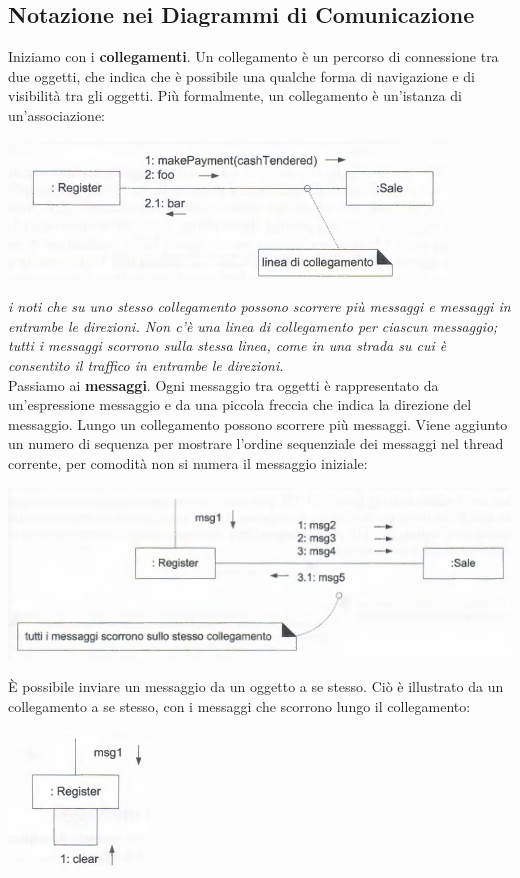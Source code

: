 \documentclass[a4paper,12pt, oneside]{book}
\begin{document}
\subsection{Notazione nei Diagrammi di Comunicazione}
Iniziamo con i \textbf{collegamenti}. Un collegamento è un percorso di connessione tra due oggetti, che indica che è possibile una qualche forma di navigazione e di visibilità tra gli oggetti. Più formalmente, un collegamento è un'istanza di un'associazione:
\begin{center}
	\includegraphics[scale=0.7]{img/comd1.png}
\end{center}
\textit{i noti che su uno stesso collegamento possono scorrere più messaggi e messaggi in
entrambe le direzioni. Non c'è una linea di collegamento per ciascun messaggio; tutti i messaggi scorrono sulla stessa linea, come in una strada su cui è consentito il traffico in
entrambe le direzioni.}\\
Passiamo ai \textbf{messaggi}. Ogni messaggio tra oggetti è rappresentato da un'espressione messaggio e da una piccola
freccia che indica la direzione del messaggio. Lungo un collegamento possono scorrere più messaggi. Viene aggiunto un numero di sequenza per mostrare l'ordine sequenziale dei messaggi nel thread corrente, per comodità non si numera il messaggio iniziale:
\begin{center}
	\includegraphics[scale=0.7]{img/comd2.png}
\end{center}
\newpage
È possibile inviare un messaggio da un oggetto a se stesso. Ciò è illustrato da un collegamento a se stesso, con i messaggi che scorrono lungo il collegamento:
\begin{center}
	\includegraphics[scale=0.7]{img/comd3.png}
\end{center}
\end{document}
